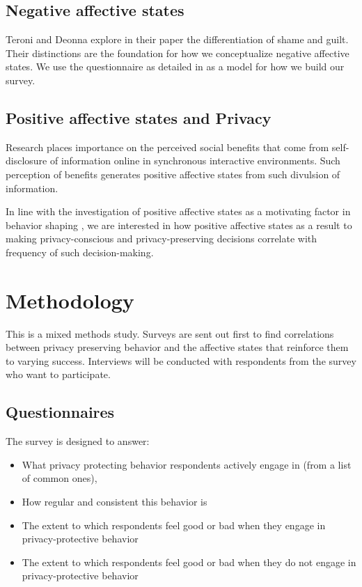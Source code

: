 \documentclass[acmtog]{acmart}
\begin{document}
\subsection{Negative affective states}
Teroni and Deonna explore in their paper the differentiation of shame and guilt. Their distinctions are the foundation for how we conceptualize negative affective states. We use the questionnaire as detailed in \cite{Rusch2007} as a model for how we build our survey.
\subsection{Positive affective states and Privacy}
Research places importance on the perceived social benefits that come from self-disclosure of information online in synchronous interactive environments\cite{Jian2013}. Such perception of benefits generates positive affective states from such divulsion of information.

In line with the investigation of positive affective states as a motivating factor in behavior shaping \cite{Taneja2014}, we are interested in how positive affective states as a result to making privacy-conscious and privacy-preserving decisions correlate with frequency of such decision-making.


\section{Methodology}
This is a mixed methods study. Surveys are sent out first to find correlations between privacy preserving behavior and the affective states that reinforce them to varying success. Interviews will be conducted with respondents from the survey who want to participate.
\pagebreak
\subsection{Questionnaires}
\nopagebreak The survey is designed to answer:
\begin{itemize}
    \item What privacy protecting behavior respondents actively engage in (from a list of common ones),
    \item How regular and consistent this behavior is
    \item The extent to which respondents feel good or bad when they engage in privacy-protective behavior
    \item The extent to which respondents feel good or bad when they do not engage in privacy-protective behavior
\end{itemize}
\end{document}
